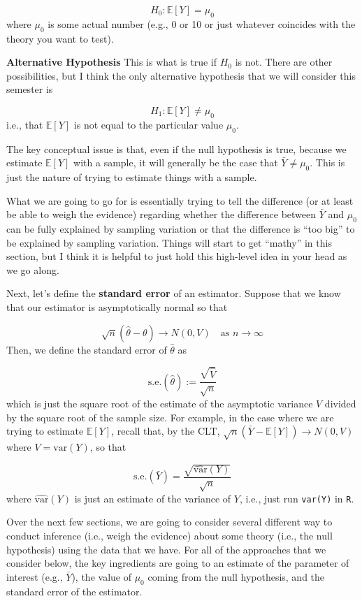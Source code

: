 \documentclass[
  letterpaper,
  DIV=11,
  numbers=noendperiod]{scrreprt}
\begin{document}
\[
  H_0 : \mathbb{E}[Y] = \mu_0
\] where \(\mu_0\) is some actual number (e.g., 0 or 10 or just whatever
coincides with the theory you want to test).

\textbf{Alternative Hypothesis} This is what is true if \(H_0\) is not.
There are other possibilities, but I think the only alternative
hypothesis that we will consider this semester is

\[
  H_1 : \mathbb{E}[Y] \neq \mu_0
\] i.e., that \(\mathbb{E}[Y]\) is not equal to the particular value
\(\mu_0\).

The key conceptual issue is that, even if the null hypothesis is true,
because we estimate \(\mathbb{E}[Y]\) with a sample, it will generally
be the case that \(\bar{Y} \neq \mu_0\). This is just the nature of
trying to estimate things with a sample.

What we are going to go for is essentially trying to tell the difference
(or at least be able to weigh the evidence) regarding whether the
difference between \(\bar{Y}\) and \(\mu_0\) can be fully explained by
sampling variation or that the difference is ``too big'' to be explained
by sampling variation. Things will start to get ``mathy'' in this
section, but I think it is helpful to just hold this high-level idea in
your head as we go along.

Next, let's define the \textbf{standard error} of an estimator. Suppose
that we know that our estimator is asymptotically normal so that

\[
  \sqrt{n}(\hat{\theta} - \theta) \rightarrow N(0,V) \quad \textrm{as } n \rightarrow \infty
\] Then, we define the standard error of \(\hat{\theta}\) as

\[
  \textrm{s.e.}(\hat{\theta}) := \frac{\sqrt{\hat{V}}}{\sqrt{n}}
\] which is just the square root of the estimate of the asymptotic
variance \(V\) divided by the square root of the sample size. For
example, in the case where we are trying to estimate \(\mathbb{E}[Y]\),
recall that, by the CLT,
\(\sqrt{n}(\bar{Y} - \mathbb{E}[Y]) \rightarrow N(0,V)\) where
\(V=\mathrm{var}(Y)\), so that

\[
  \textrm{s.e.}(\bar{Y}) = \frac{\sqrt{\widehat{\mathrm{var}}(Y)}}{\sqrt{n}}
\] where \(\widehat{\mathrm{var}}(Y)\) is just an estimate of the
variance of \(Y\), i.e., just run \texttt{var(Y)} in \texttt{R}.

Over the next few sections, we are going to consider several different
way to conduct inference (i.e., weigh the evidence) about some theory
(i.e., the null hypothesis) using the data that we have. For all of the
approaches that we consider below, the key ingredients are going to an
estimate of the parameter of interest (e.g., \(\bar{Y}\)), the value of
\(\mu_0\) coming from the null hypothesis, and the standard error of the
estimator.
\end{document}
